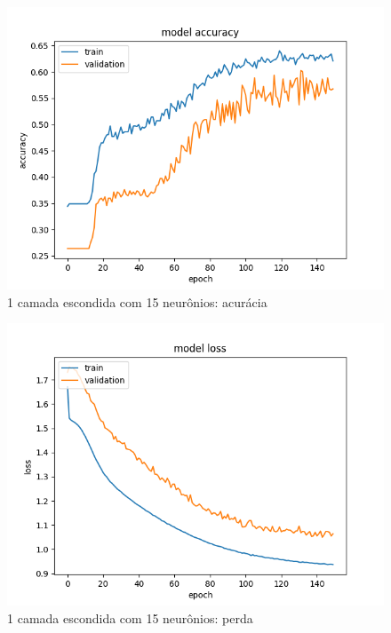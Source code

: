 \documentclass[11pt]{article}
\begin{document}
\begin{figure}
	\includegraphics[width=\linewidth]{exp/Figure_3.png}
	\caption{1 camada escondida com 15 neurônios: acurácia}
	\label{fig:f3}
\end{figure}

\begin{figure}
	\includegraphics[width=\linewidth]{exp/Figure_3-2.png}
	\caption{1 camada escondida com 15 neurônios: perda}
	\label{fig:f31}
\end{figure}
\end{document}
